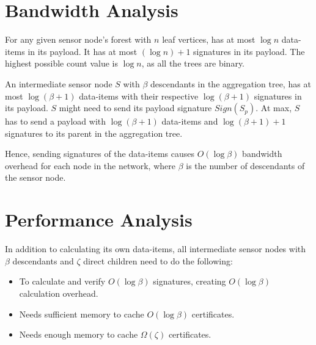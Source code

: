 	
\section{Bandwidth Analysis}
	For any given sensor node's forest with $n$ leaf vertices, has at most $\log n$ data-items in its payload.
	It has at most $(\log n) +1$ signatures in its payload.
	The highest possible count value is $\log n$, as all the trees are binary. 

	An intermediate sensor node $S$ with $\beta$ descendants in the aggregation tree, has at most $\log(\beta+1)$ data-items with their respective $\log(\beta+1)$ signatures in its payload.
	$S$ might need to send its payload signature $Sign(S_{p})$.
	At max, $S$ has to send a payload with $\log(\beta+1)$ data-items and $\log(\beta+1) +1$ signatures to its parent in the aggregation tree.
	
	Hence, sending signatures of the data-items causes $O(\log \beta)$ bandwidth overhead for each node in the network, where $\beta$ is the number of descendants of the sensor node. 

\section{Performance Analysis}
	In addition to calculating its own data-items, all intermediate sensor nodes with $\beta$ descendants and $\zeta$ direct children need to do the following:
	\begin{itemize}
		\item To calculate and verify $O(\log \beta)$ signatures, creating $O(\log \beta)$ calculation overhead. 
		\item Needs sufficient memory to cache $O(\log \beta)$ certificates. 
		\item Needs enough memory to cache $\Omega(\zeta)$ certificates.
	\end{itemize}


